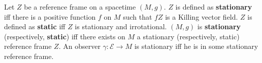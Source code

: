 Let $Z$ be a reference frame on a spacetime $(M, g)$. $Z$ is defined as \textbf{stationary} iff there is a positive function $f$ on $M$ such that $fZ$ is a Killing vector field. $Z$ is defined as \textbf{static} iff $Z$ is stationary and irrotational. $(M, g)$ is \textbf{stationary} (respectively, \textbf{static}) iff there exists on $M$ a stationary (respectively, static) reference frame $Z$. An observer $\gamma: \mathcal{E} \to M$ is stationary iff he is in some stationary reference frame.
